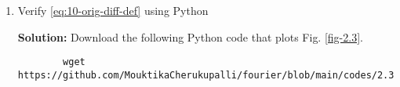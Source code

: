\documentclass[journal,12pt,twocolumn]{IEEEtran}
\newcommand{\solution}{\noindent \textbf{Solution: }}
\providecommand{\brak}[1]{\ensuremath{\left(#1\right)}}
\providecommand{\cbrak}[1]{\ensuremath{\left\{#1\right\}}}
\providecommand{\sbrak}[1]{\ensuremath{\left[#1\right]}}
\providecommand{\der}[1]{\mathrm{d} #1}
\providecommand{\abs}[1]{\left\vert#1\right\vert}
\numberwithin{equation}{section}
\numberwithin{figure}{section}
\renewcommand\thesection{\arabic{section}}
\begin{document}
\begin{enumerate}[label=\thesection.\arabic*,ref=\thesection.\theenumi]
	\solution
	\begin{align}
		c_k = f_0\int_{-\frac{1}{2f_0}}^{\frac{1}{2f_0}}A_0\abs{\sin\brak{2\pi f_0 t}}e^{-\j2\pi kf_0 t}\, \der{t}
	\end{align}
	\begin{multline}
		c_k = f_0\int_{-\frac{1}{2f_0}}^{0}A_0\brak{-\sin\brak{2\pi f_0 t}}e^{-\j2\pi kf_0 t}\, \der{t} \\ +f_0\int_{0}^{\frac{1}{2f_0}}A_0\brak{\sin\brak{2\pi f_0 t}}e^{-\j2\pi kf_0 t}\, \der{t}
	\end{multline}
	\begin{multline}
		c_k = f_0\int_{0}^{\frac{1}{2f_0}}A_0\sin\brak{2\pi f_0 u}e^{\j2\pi kf_0 u}\, \der{t} \\ +f_0\int_{0}^{\frac{1}{2f_0}}A_0\sin\brak{2\pi f_0 t}e^{-\j2\pi kf_0 t}\, \der{t}
	\end{multline}
	\begin{align}
		c_k &= f_0 \int_{0}^{\frac{1}{2f_0}} A_0\sin\brak{2\pi f_0 t} \brak{e^{\j2\pi kf_0 t} + e^{-\j2\pi kf_0 t}} \,\der{t} \\
		&= f_0A_0 \int_{0}^{\frac{1}{2f_0}} 2\sin\brak{2\pi f_0 t} \cos\brak{2\pi k f_0 t} \,\der{t} \\
		&= f_0A_0 \int_{0}^{\frac{1}{2f_0}} \cbrak{\sin\brak{2\pi(1+k)f_0t} + \sin\brak{2\pi(1-k)f_0t}} \,\der{t} \\
		&= f_0A_0 \sbrak{-\frac{\cos\brak{2\pi(1+k)f_0t}}{2\pi(1+k)f_0} - \frac{\cos\brak{2\pi(1-k)f_0t}}{2\pi(1-k)f_0}}_0^{\frac{1}{2f_0}} \\
		&= \frac{f_0A_0}{2\pi f_0} \sbrak{\frac{1-(-1)^{1+k}}{1+k} + \frac{1-(-1)^{1-k}}{1-k}} \\
		&= \brak{1 + (-1)^k} \frac{A_0}{2\pi} \sbrak{\frac{1}{1+k} + \frac{1}{1-k}} \\
		&= \brak{1 + (-1)^k} \frac{A_0}{\pi(1-k^2)}
	\end{align}
	
	Therefore
	\begin{align}
		c_k = 
		\begin{cases}
			\frac{2A_0}{\pi(1-k^2)} & k \text{ is even} \\
			0 & k \text{ is odd} 
		\end{cases}
	\end{align}
	
	\item Verify \eqref{eq:10-orig-diff-def} using Python
	
	\solution Download the following Python code that plots Fig. \ref{fig-2.3}.
	\begin{lstlisting}
		wget https://github.com/MouktikaCherukupalli/fourier/blob/main/codes/2.3.py
	\end{lstlisting}
	

\end{enumerate}
\end{document}
